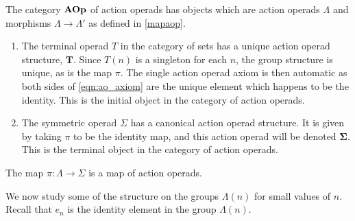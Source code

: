 \begin{Defi}\label{Defi:cat_aop}
The category $\mathbf{AOp}$ of action operads has objects which are action operads $\Lambda$ and
 morphisms $\Lambda \rightarrow \Lambda'$ as defined in \cref{mapaop}.
\end{Defi}

\begin{example}
\begin{enumerate}
\item The terminal operad $T$ in the category of sets has a unique action operad structure, $\mathbf{T}$. Since $T(n)$ is a singleton for each $n$, the group structure is unique, as is the map $\pi$. The single action operad axiom is then automatic as both sides of \cref{eqn:ao_axiom} are the unique element which happens to be the identity. This is the initial object in the category of action operads.
\item The symmetric operad $\Sigma$ has a canonical action operad structure. It is given by taking $\pi$ to be the identity map, and this action operad will be denoted $\mathbf{\Sigma}$. This is the terminal object in the category of action operads.
\end{enumerate}
\end{example}

\begin{prop}
The map $\pi \colon \Lambda \rightarrow \Sigma$ is a map of action operads.
\end{prop}


We now study some of the structure on the groups $\Lambda(n)$ for small values of $n$. Recall that $e_{n}$ is the identity element in the group $\Lambda(n)$.

